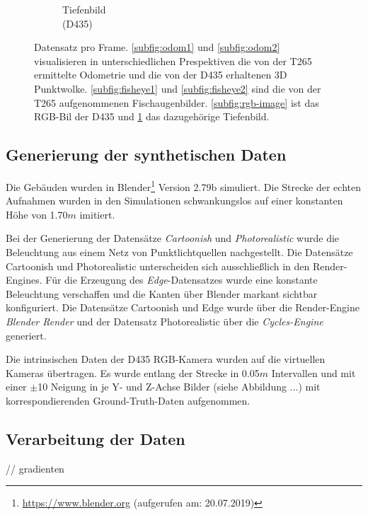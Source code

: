 \begin{figure}[H]
\begin{subfigure}[b]{0.3\linewidth}
		\caption{Tiefenbild \\ (D435) \hspace*{2cm}}
		\label{subfig:depth-image}
	\end{subfigure}
	\caption{Datensatz pro Frame. \ref{subfig:odom1}  und \ref{subfig:odom2} visualisieren in unterschiedlichen Prespektiven die von der T265 ermittelte Odometrie und die von der D435 erhaltenen 3D Punktwolke. \ref{subfig:fisheye1} und \ref{subfig:fisheye2} sind die von der T265 aufgenommenen Fischaugenbilder. \ref{subfig:rgb-image} ist das RGB-Bil der D435 und \ref{subfig:depth-image} das dazugehörige Tiefenbild. }
	\label{fig:dataset}
\end{figure}


\subsection{Generierung der synthetischen Daten}
\label{subsec:generate_synth_images}

Die Gebäuden wurden in Blender\footnote{\url{https://www.blender.org} (aufgerufen am: 20.07.2019)} Version 2.79b simuliert. Die Strecke der echten Aufnahmen wurden in den Simulationen schwankungslos auf einer konstanten Höhe von 1.70$m$ imitiert.

Bei der Generierung der Datensätze \textit{Cartoonish} und \textit{Photorealistic} wurde die Beleuchtung aus einem Netz von Punktlichtquellen nachgestellt. Die Datensätze Cartoonish und Photorealistic unterscheiden sich ausschließlich in den Render-Engines.
Für die Erzeugung des \textit{Edge}-Datensatzes wurde eine konstante Beleuchtung verschaffen und die Kanten über Blender markant sichtbar konfiguriert. Die Datensätze Cartoonish und Edge wurde über die Render-Engine \textit{Blender Render} und der Datensatz Photorealistic über die \textit{Cycles-Engine} generiert.

Die intrinsischen Daten der D435 RGB-Kamera wurden auf die virtuellen Kameras übertragen. Es wurde entlang der Strecke in 0.05$m$ Intervallen und mit einer $\pm$10 Neigung in je Y- und Z-Achse Bilder (siehe Abbildung ...) mit korrespondierenden Ground-Truth-Daten aufgenommen. 




\subsection{Verarbeitung der Daten}
// gradienten\\

